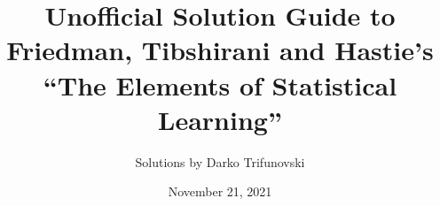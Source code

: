 \documentclass[oneside]{memoir}
\title{Unofficial Solution Guide to Friedman, Tibshirani and Hastie's \\ ``The Elements of Statistical Learning''}
\author{Solutions by Darko Trifunovski}
\date{November 21, 2021}
\theoremstyle{definition}
\begin{document}
\frontmatter
\begin{titlingpage}
  \maketitle
\end{titlingpage}
\tableofcontents

\mainmatter
\setcounter{chapter}{1}
















\end{document}
